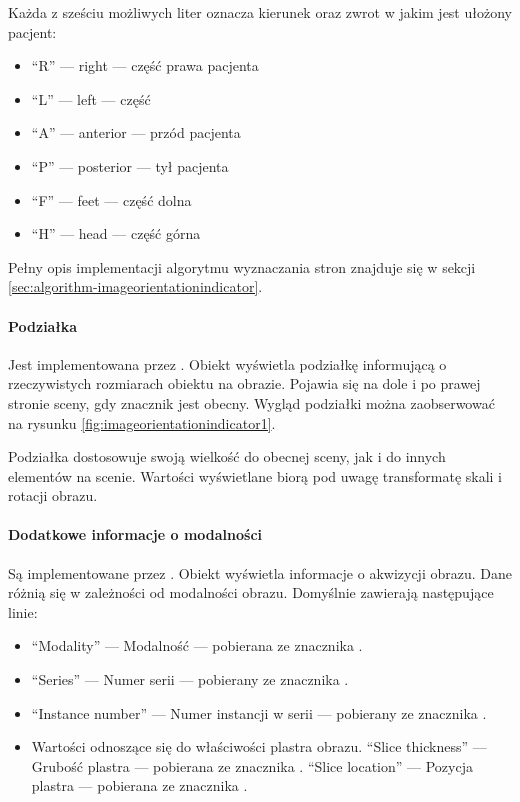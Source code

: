 \par
Każda z sześciu możliwych liter oznacza kierunek oraz zwrot w jakim jest ułożony pacjent:
\begin{itemize}
    \item \enquote{R} --- right --- część prawa pacjenta
    \item \enquote{L} --- left --- część
    \item \enquote{A} --- anterior --- przód pacjenta
    \item \enquote{P} --- posterior --- tył pacjenta
    \item \enquote{F} --- feet --- część dolna
    \item \enquote{H} --- head --- część górna
\end{itemize}

\par
Pełny opis implementacji algorytmu wyznaczania stron znajduje się w sekcji \ref{sec:algorithm-imageorientationindicator}.

\paragraph{Podziałka}

Jest implementowana przez .
Obiekt wyświetla podziałkę informującą o rzeczywistych rozmiarach obiektu na obrazie.
Pojawia się na dole i po prawej stronie sceny, gdy znacznik  jest obecny.
Wygląd podziałki można zaobserwować na rysunku \ref{fig:imageorientationindicator1}.

Podziałka dostosowuje swoją wielkość do obecnej sceny, jak i do innych elementów na scenie.
Wartości wyświetlane biorą pod uwagę transformatę skali i rotacji obrazu.

\paragraph{Dodatkowe informacje o modalności}

Są implementowane przez .
Obiekt wyświetla informacje o akwizycji obrazu.
Dane różnią się w zależności od modalności obrazu.
Domyślnie zawierają następujące linie:
\begin{itemize}
    \item \enquote{Modality} --- Modalność --- pobierana ze znacznika .
    \item \enquote{Series} --- Numer serii --- pobierany ze znacznika .
    \item \enquote{Instance number} --- Numer instancji w serii --- pobierany ze znacznika .
    \item Wartości odnoszące się do właściwości plastra obrazu.
          \enquote{Slice thickness} --- Grubość plastra --- pobierana ze znacznika .
          \enquote{Slice location} --- Pozycja plastra --- pobierana ze znacznika .
\end{itemize}

